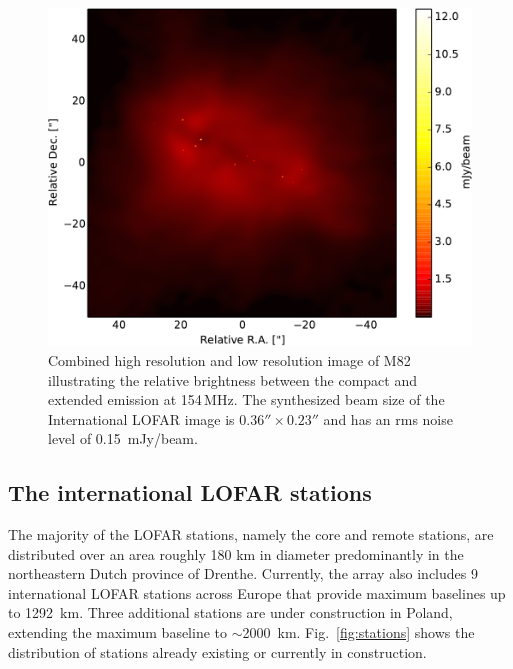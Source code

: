 \documentclass[graybox]{svmult}
\begin{document}
\begin{figure}
\begin{center}
\includegraphics[width=\textwidth]{figures/M82HIGH_FEATHER-crop.pdf}
\caption{Combined high resolution and low resolution image of M82 illustrating
the relative brightness between the compact and extended emission at 154\,MHz.
The synthesized beam size of the International LOFAR image is
$0.36''\times0.23''$ and has an rms noise level of 0.15~mJy/beam. \citep{varenius15}}
\label{fig:m82}
\end{center}
\end{figure}

\subsection{The international LOFAR stations}
The majority of the LOFAR stations, namely the core and remote stations, are
distributed over an area roughly 180 km in diameter predominantly in the
northeastern Dutch province of Drenthe. Currently, the array also includes 9
international LOFAR stations across Europe that provide maximum baselines up to
1292~km. Three additional stations are under construction in Poland,
extending the maximum baseline to $\sim$2000~km. Fig.~\ref{fig:stations} shows
the distribution of stations already existing or currently in construction.

\end{document}
